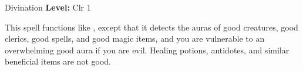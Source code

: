 {Divination}
{
	\textbf{Level:}
	Clr 1\\
}
{
	This spell functions like , except that it detects the auras of good creatures, good clerics, good spells, and good magic items, and you are vulnerable to an overwhelming good aura if you are evil. Healing potions, antidotes, and similar beneficial items are not good.

}
